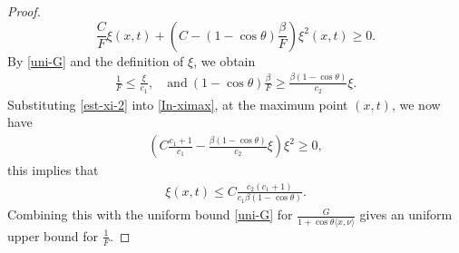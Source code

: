 \documentclass[11pt,reqno]{amsart}
\theoremstyle{definition}
\theoremstyle{remark}
\numberwithin{equation}{section}
\renewcommand{\(}{\left(}
\renewcommand{\)}{\right)}
\renewcommand{\-}{\overline}
\begin{document}
\begin{proof}
\begin{equation}\label{In-ximax}
 \frac{C}{F}\xi(x,t)+(C-(1-\cos\theta)\frac{\beta}{F})\xi^2(x,t)\geq0.
\end{equation}
By \eqref{uni-G} and the definition of $\xi$, we obtain
\begin{align}\label{est-xi-2}
\frac{1}{F}\leq\frac{\xi}{c_1}, \quad \text{and}\ 	(1-\cos\theta)\frac{\beta}{F}\geq\frac{\beta(1-\cos\theta)}{c_2}\xi.
\end{align}
Substituting \eqref{est-xi-2} into \eqref{In-ximax}, at the maximum point $(x,t)$, we now have
\begin{align}
	\left(C\frac{c_1+1}{c_1}-\frac{\beta(1-\cos\theta)}{c_2}\xi\right)\xi^2\geq0,
\end{align}
this implies that 
\begin{align*}
	\xi(x,t)\leq C\frac{c_2(c_1+1)}{c_1\beta(1-\cos\theta)}.
\end{align*}
	Combining this with the uniform bound \eqref{uni-G} for $\frac{G}{1+\cos\theta\langle x,\nu\rangle}$ gives an uniform upper bound for $\frac{1}{F}$.


%
%

\end{proof}
\end{document}
